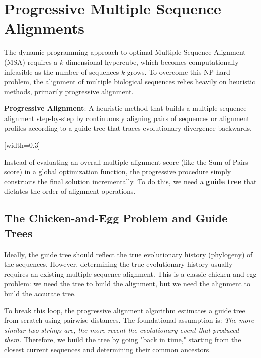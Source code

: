 

\section{Progressive Multiple Sequence Alignments}
The dynamic programming approach to optimal Multiple Sequence Alignment (MSA) requires a $k$-dimensional hypercube, which becomes computationally infeasible as the number of sequences $k$ grows. To overcome this NP-hard problem, the alignment of multiple biological sequences relies heavily on heuristic methods, primarily progressive alignment.

\begin{important}
\textbf{Progressive Alignment}: A heuristic method that builds a multiple sequence alignment step-by-step by continuously aligning pairs of sequences or alignment profiles according to a guide tree that traces evolutionary divergence backwards.
\end{important}

[width=0.3\textwidth]

Instead of evaluating an overall multiple alignment score (like the Sum of Pairs score) in a global optimization function, the progressive procedure simply constructs the final solution incrementally. To do this, we need a \textbf{guide tree} that dictates the order of alignment operations.

\subsection{The Chicken-and-Egg Problem and Guide Trees}
Ideally, the guide tree should reflect the true evolutionary history (phylogeny) of the sequences. However, determining the true evolutionary history usually requires an existing multiple sequence alignment.
\sta This is a classic chicken-and-egg problem: we need the tree to build the alignment, but we need the alignment to build the accurate tree.

To break this loop, the progressive alignment algorithm estimates a guide tree from scratch using pairwise distances. The foundational assumption is: \textit{The more similar two strings are, the more recent the evolutionary event that produced them.} Therefore, we build the tree by going "back in time," starting from the closest current sequences and determining their common ancestors.

